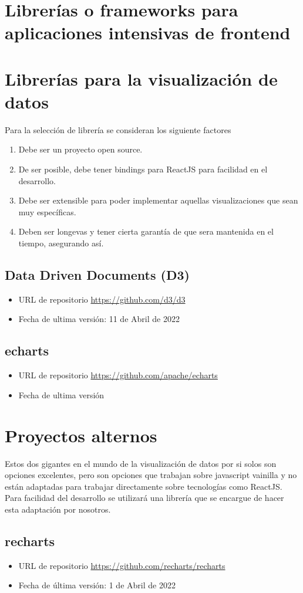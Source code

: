 \section{Librerías o frameworks para aplicaciones intensivas de frontend}

\section{Librerías para la visualización de datos}
Para la selección de librería se consideran los siguiente factores


\begin{enumerate}
    \item {Debe ser un proyecto open source.}
    \item {De ser posible, debe tener bindings para ReactJS para facilidad en el desarrollo.}
    \item {Debe ser extensible para poder implementar aquellas visualizaciones que sean muy específicas.}
    \item {Deben ser longevas y tener cierta garantía de que sera mantenida en el tiempo, asegurando así.}
\end{enumerate}


\subsection{ Data Driven Documents (D3) }
\begin{itemize}
    \item URL de repositorio \href{https://github.com/d3/d3}{https://github.com/d3/d3}
    \item Fecha de ultima versión: 11 de Abril de 2022
\end{itemize}

\subsection{ echarts }
\begin{itemize}
    \item URL de repositorio \href{https://github.com/apache/echarts}{https://github.com/apache/echarts}
    \item Fecha de ultima versión
\end{itemize}

\section{ Proyectos alternos }
Estos dos gigantes en el mundo de la visualización de datos por si solos son opciones excelentes,
pero son opciones que trabajan sobre javascript vainilla y no están adaptadas para trabajar directamente sobre tecnologías como ReactJS.
Para facilidad del desarrollo se utilizará una librería que se encargue de hacer esta adaptación por nosotros.

\subsection{ recharts }
\begin{itemize}
    \item URL de repositorio \href{https://github.com/recharts/recharts}{https://github.com/recharts/recharts}
    \item Fecha de última versión: 1 de Abril de 2022
\end{itemize}
